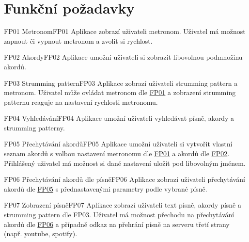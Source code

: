 \section{Funkční požadavky}
\label{sc:functional_req}

\begin{requirment}{FP01 Metronom}{FP01}
    Aplikace zobrazí uživateli metronom. Uživatel má možnost zapnout či vypnout metronom a zvolit si rychlost.
\end{requirment}

\begin{requirment}{FP02 Akordy}{FP02}
    Aplikace umožní uživateli si zobrazit libovolnou podmnožinu akordů.
\end{requirment}

\begin{requirment}{FP03 Strumming pattern}{FP03}
    Aplikace zobrazí uživateli strumming pattern a metronom. Uživatel může ovládat metronom dle \hyperref[FP01]{FP01} a zobrazení strumming patternu reaguje na nastavení rychlosti metronomu.
\end{requirment}

\begin{requirment}{FP04 Vyhledávání}{FP04}
    Aplikace umožní uživateli vyhledávat písně, akordy a strumming patterny.
\end{requirment}

\begin{requirment}{FP05 Přechytávání akordů}{FP05}
    Aplikace umožní uživateli si vytvořit vlastní seznam akordů s volbou nastavení metronomu dle \hyperref[FP01]{FP01} a akordů dle \hyperref[FP02]{FP02}.
    Přihlášený uživatel má možnost si dané nastavení uložit pod libovolným jménem.
\end{requirment}

\begin{requirment}{FP06 Přechytávání akordů dle písně}{FP06}
    Aplikace zobrazí uživateli přechytávání akordů dle \hyperref[FP05]{FP05} s přednastavenými parametry podle vybrané písně.
\end{requirment}

\begin{requirment}{FP07 Zobrazení písně}{FP07}
    Aplikace zobrazí uživateli text písně, akordy písně a strumming pattern dle \hyperref[FP03]{FP03}. Uživatel má možnost přechodu na přechytávání akordů dle \hyperref[FP06]{FP06} a případně odkaz na přehrání písně na serveru třetí strany (např. youtube, spotify).
\end{requirment}

